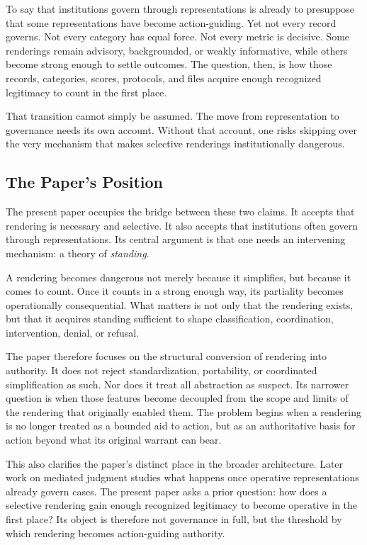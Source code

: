 \documentclass[11pt]{article}
\renewcommand{\emph}[1]{\textit{#1}}
\begin{document}
To say that institutions govern through representations is already to presuppose that some representations have become action-guiding. Yet not every record governs. Not every category has equal force. Not every metric is decisive. Some renderings remain advisory, backgrounded, or weakly informative, while others become strong enough to settle outcomes. The question, then, is how those records, categories, scores, protocols, and files acquire enough recognized legitimacy to count in the first place.

That transition cannot simply be assumed. The move from representation to governance needs its own account. Without that account, one risks skipping over the very mechanism that makes selective renderings institutionally dangerous.

\subsection{The Paper's Position}

The present paper occupies the bridge between these two claims. It accepts that rendering is necessary and selective. It also accepts that institutions often govern through representations. Its central argument is that one needs an intervening mechanism: a theory of \emph{standing}.

A rendering becomes dangerous not merely because it simplifies, but because it comes to count. Once it counts in a strong enough way, its partiality becomes operationally consequential. What matters is not only that the rendering exists, but that it acquires standing sufficient to shape classification, coordination, intervention, denial, or refusal.

The paper therefore focuses on the structural conversion of rendering into authority. It does not reject standardization, portability, or coordinated simplification as such. Nor does it treat all abstraction as suspect. Its narrower question is when those features become decoupled from the scope and limits of the rendering that originally enabled them. The problem begins when a rendering is no longer treated as a bounded aid to action, but as an authoritative basis for action beyond what its original warrant can bear.

This also clarifies the paper's distinct place in the broader architecture. Later work on mediated judgment studies what happens once operative representations already govern cases.\cite{Swanson2026MediatedJudgmentConstraint} The present paper asks a prior question: how does a selective rendering gain enough recognized legitimacy to become operative in the first place? Its object is therefore not governance in full, but the threshold by which rendering becomes action-guiding authority.
\end{document}
